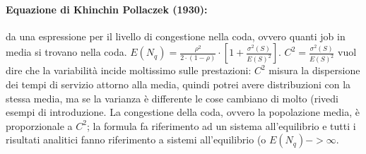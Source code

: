 \documentclass{article}
\begin{document}
\paragraph{Equazione di Khinchin Pollaczek (1930):}da una espressione per il livello di congestione nella coda, ovvero quanti job in media si trovano nella coda. $E(N_q) = \frac{\rho^2}{2\cdot (1 - \rho)} \cdot [1 + \frac{\sigma^2(S)}{E(S)^2}]$. $C^2 = \frac{\sigma^2(S)}{E(S)^2}$ vuol dire che la variabilità incide moltissimo sulle prestazioni: $C^2$ misura la dispersione dei tempi di servizio attorno alla media, quindi potrei avere distribuzioni con la stessa media, ma se la varianza è differente le cose cambiano di molto (rivedi esempi di introduzione. La congestione della coda, ovvero la popolazione media, è proporzionale a $C^2$; la formula fa riferimento ad un sistema all'equilibrio e tutti i risultati analitici fanno riferimento a sistemi all'equilibrio (o $E(N_q) -> \infty$.
\end{document}
